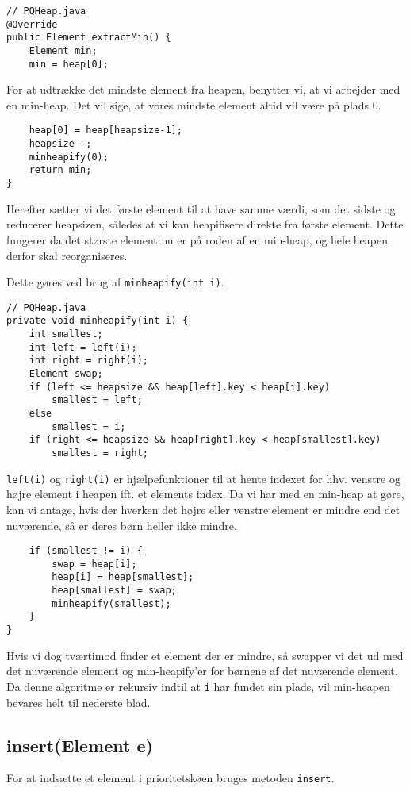 \documentclass{article}
\begin{document}
\begin{lstlisting}
// PQHeap.java
@Override
public Element extractMin() {
    Element min;
    min = heap[0];    
\end{lstlisting}
\bigskip
For at udtrække det mindste element fra heapen, benytter vi, at vi arbejder med en min-heap. Det vil sige, at vores mindste element altid vil være på plads 0.
\begin{lstlisting}    
    heap[0] = heap[heapsize-1];
    heapsize--;
    minheapify(0);
    return min;
}
\end{lstlisting}
Herefter sætter vi det første element til at have samme værdi, som det sidste og reducerer heapsizen, således at vi kan heapifisere direkte fra første element. Dette fungerer da det største element nu er på roden af en min-heap, og hele heapen derfor skal reorganiseres. \newline

\noindent Dette gøres ved brug af \texttt{minheapify(int i)}.

\newpage

\begin{lstlisting}
// PQHeap.java
private void minheapify(int i) {
    int smallest;
    int left = left(i);
    int right = right(i);
    Element swap;
    if (left <= heapsize && heap[left].key < heap[i].key)
        smallest = left;
    else
        smallest = i;
    if (right <= heapsize && heap[right].key < heap[smallest].key)
        smallest = right;
\end{lstlisting}
\texttt{left(i)} og \texttt{right(i)} er hjælpefunktioner til at hente indexet for hhv. venstre og højre element i heapen ift. et elements index.
Da vi har med en min-heap at gøre, kan vi antage, hvis der hverken det højre eller venstre element er mindre end det nuværende, så er deres børn heller ikke mindre.
\begin{lstlisting}
    if (smallest != i) {
        swap = heap[i];
        heap[i] = heap[smallest];
        heap[smallest] = swap;
        minheapify(smallest);
    }
}
\end{lstlisting}
 Hvis vi dog tværtimod finder et element der er mindre, så swapper vi det ud med det nuværende element og min-heapify'er for børnene af det nuværende element. Da denne algoritme er rekursiv indtil at \texttt{i} har fundet sin plads, vil min-heapen bevares helt til nederste blad.
 
\subsection*{insert(Element e)}
For at indsætte et element i prioritetskøen bruges metoden \texttt{insert}.
\end{document}
